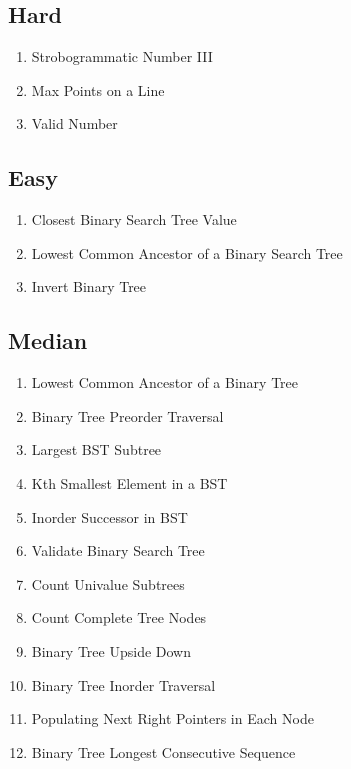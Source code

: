 \documentclass[DIV=calc, paper=a4, fontsize=11pt, twocolumn]{scrartcl}	 %
\begin{document}
\subsection*{Hard}
\begin{enumerate}
\item Strobogrammatic Number III  \cite{248}
\item Max Points on a Line    \cite{149}
\item Valid Number   \cite{65}
\end{enumerate}


\subsection*{Easy}
\begin{enumerate}
\item Closest Binary Search Tree Value \cite{270}
\item Lowest Common Ancestor of a Binary Search Tree \cite{235}
\item Invert Binary Tree \cite{226}
\end{enumerate}

\subsection*{Median}
\begin{enumerate}
\item Lowest Common Ancestor of a Binary Tree \cite{236}
\item Binary Tree Preorder Traversal  \cite{144}
\item Largest BST Subtree   \cite{333}
\item Kth Smallest Element in a BST  \cite{230}
\item Inorder Successor in BST    \cite{285}
\item  Validate Binary Search Tree \cite{098}
\item Count Univalue Subtrees    \cite{250}
\item Count Complete Tree Nodes  \cite{222}
\item Binary Tree Upside Down  \cite{156}
\item  Binary Tree Inorder Traversal  \cite{094}
\item Populating Next Right Pointers in Each Node \cite{116}
\item Binary Tree Longest Consecutive Sequence   \cite{298}
\end{enumerate}
\end{document}
